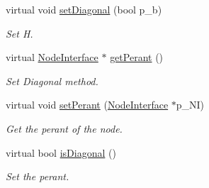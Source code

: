 \begin{DoxyCompactItemize}
virtual void \mbox{\hyperlink{class_node_interface_a759b060003767c5319c1c568705696e0}{set\+Diagonal}} (bool p\+\_\+b)
\begin{DoxyCompactList}\small\item\em Set H. \end{DoxyCompactList}\item 
virtual \mbox{\hyperlink{class_node_interface}{Node\+Interface}} $\ast$ \mbox{\hyperlink{class_node_interface_ade5a090eeac6a245475f49589c79be8a}{get\+Perant}} ()
\begin{DoxyCompactList}\small\item\em Set Diagonal method. \end{DoxyCompactList}\item 
\mbox{\label{class_node_interface_a6b1ea79473c66ffc69454d798943d4a0}} 
virtual void \mbox{\hyperlink{class_node_interface_a6b1ea79473c66ffc69454d798943d4a0}{set\+Perant}} (\mbox{\hyperlink{class_node_interface}{Node\+Interface}} $\ast$p\+\_\+\+NI)
\begin{DoxyCompactList}\small\item\em Get the perant of the node. \end{DoxyCompactList}\item 
virtual bool \mbox{\hyperlink{class_node_interface_a4baa534fe0139637524fcd05cf9f5fe6}{is\+Diagonal}} ()
\begin{DoxyCompactList}\small\item\em Set the perant. \end{DoxyCompactList}\end{DoxyCompactItemize}
